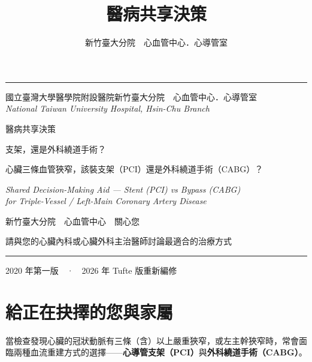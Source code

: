 \documentclass[justified,nobib,openany]{tufte-book}
\title{\heibold 醫病共享決策}
\author{\hei 新竹臺大分院　心血管中心．心導管室}
\date{}
\renewcommand{\newthought}[1]{{\heibold\color{hfteal}#1}}
\begin{document}
\frontmatter

\begin{titlepage}
\sffamily
{}
\color{hfteal}
\noindent\rule{\textwidth}{1.2pt}\par
\vspace{1.4cm}
{\hei\footnotesize\color{hfslate} 國立臺灣大學醫學院附設醫院新竹臺大分院　心血管中心．心導管室\\
\normalfont\itshape National Taiwan University Hospital, Hsin-Chu Branch}\par
\vspace{2.4cm}
{\heibold\fontsize{50}{56}\selectfont\color{hfteal} 醫病共享決策}\par
\vspace{0.7cm}
{\heibold\fontsize{30}{38}\selectfont\color{hfred} 支架，還是外科繞道手術？}\par
\vspace{0.7cm}
{\hei\large\color{hfslate} 心臟三條血管狹窄，該裝支架（PCI）還是外科繞道手術（CABG）？}\par
\vspace{0.3cm}
{\normalfont\itshape\normalsize\color{hfslate} Shared Decision-Making Aid — Stent (PCI) vs Bypass (CABG)\\
for Triple-Vessel / Left-Main Coronary Artery Disease}\par
\vfill
{\hei\large\color{hfslate} 新竹臺大分院　心血管中心　關心您}\par
\vspace{0.3cm}
{\hei\normalsize\color{hfslate} 請與您的心臟內科或心臟外科主治醫師討論最適合的治療方式}\par
\vspace{0.8cm}
\noindent\rule{\textwidth}{0.6pt}\par
\vspace{0.2cm}
{\hei\footnotesize\color{hfslate} 2020 年第一版　·　2026 年 Tufte 版重新編修}\par
\restoregeometry
\end{titlepage}

\cleardoublepage
\chapter*{給正在抉擇的您與家屬}
\newthought{當檢查發現}心臟的冠狀動脈有三條（含）以上嚴重狹窄，或左主幹狹窄時，常會面臨兩種血流重建方式的選擇——\textbf{心導管支架（PCI）}與\textbf{外科繞道手術（CABG）}。
\end{document}
